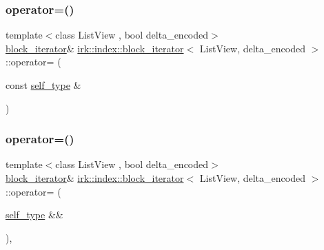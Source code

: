 \subsubsection{\texorpdfstring{operator=()}{operator=()}\hspace{0.1cm}{\footnotesize\ttfamily [1/2]}}
{\footnotesize\ttfamily template$<$class List\+View , bool delta\+\_\+encoded$>$ \\
\mbox{\hyperlink{classirk_1_1index_1_1block__iterator}{block\+\_\+iterator}}\& \mbox{\hyperlink{classirk_1_1index_1_1block__iterator}{irk\+::index\+::block\+\_\+iterator}}$<$ List\+View, delta\+\_\+encoded $>$\+::operator= (\begin{DoxyParamCaption}\item[{const \mbox{\hyperlink{classirk_1_1index_1_1block__iterator_a338ee8fee726492e9f8bbad4b4d75766}{self\+\_\+type}} \&}]{ }\end{DoxyParamCaption})\hspace{0.3cm}{\ttfamily [delete]}}

\mbox{\label{classirk_1_1index_1_1block__iterator_a6696d285fe4899cb9aec7ac50fb09ad6}} 
\subsubsection{\texorpdfstring{operator=()}{operator=()}\hspace{0.1cm}{\footnotesize\ttfamily [2/2]}}
{\footnotesize\ttfamily template$<$class List\+View , bool delta\+\_\+encoded$>$ \\
\mbox{\hyperlink{classirk_1_1index_1_1block__iterator}{block\+\_\+iterator}}\& \mbox{\hyperlink{classirk_1_1index_1_1block__iterator}{irk\+::index\+::block\+\_\+iterator}}$<$ List\+View, delta\+\_\+encoded $>$\+::operator= (\begin{DoxyParamCaption}\item[{\mbox{\hyperlink{classirk_1_1index_1_1block__iterator_a338ee8fee726492e9f8bbad4b4d75766}{self\+\_\+type}} \&\&}]{ }\end{DoxyParamCaption})\hspace{0.3cm}{\ttfamily [delete]}, {\ttfamily [noexcept]}}

\mbox{\label{classirk_1_1index_1_1block__iterator_a145b1a3e5f50d3eb0fc1135cda5f1253}} 
